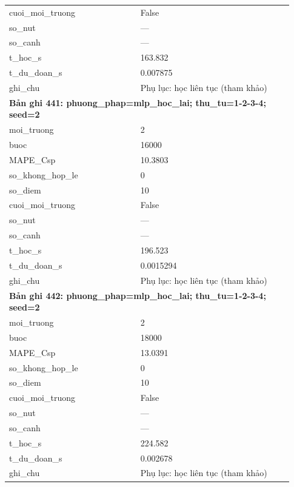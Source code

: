 \begin{longtable}{p{0.43\linewidth}p{0.50\linewidth}}
cuoi\_\allowbreak moi\_\allowbreak truong & False \\
so\_\allowbreak nut & — \\
so\_\allowbreak canh & — \\
t\_\allowbreak hoc\_\allowbreak s & 163.832 \\
t\_\allowbreak du\_\allowbreak doan\_\allowbreak s & 0.007875 \\
ghi\_\allowbreak chu & Phụ lục: học liên tục (tham khảo) \\
\midrule
\multicolumn{2}{p{0.95\linewidth}}{\textbf{Bản ghi 441: phuong\_phap=mlp\_hoc\_lai; thu\_tu=1-2-3-4; seed=2}} \\
moi\_\allowbreak truong & 2 \\
buoc & 16000 \\
MAPE\_\allowbreak Csp & 10.3803 \\
so\_\allowbreak khong\_\allowbreak hop\_\allowbreak le & 0 \\
so\_\allowbreak diem & 10 \\
cuoi\_\allowbreak moi\_\allowbreak truong & False \\
so\_\allowbreak nut & — \\
so\_\allowbreak canh & — \\
t\_\allowbreak hoc\_\allowbreak s & 196.523 \\
t\_\allowbreak du\_\allowbreak doan\_\allowbreak s & 0.0015294 \\
ghi\_\allowbreak chu & Phụ lục: học liên tục (tham khảo) \\
\midrule
\multicolumn{2}{p{0.95\linewidth}}{\textbf{Bản ghi 442: phuong\_phap=mlp\_hoc\_lai; thu\_tu=1-2-3-4; seed=2}} \\
moi\_\allowbreak truong & 2 \\
buoc & 18000 \\
MAPE\_\allowbreak Csp & 13.0391 \\
so\_\allowbreak khong\_\allowbreak hop\_\allowbreak le & 0 \\
so\_\allowbreak diem & 10 \\
cuoi\_\allowbreak moi\_\allowbreak truong & False \\
so\_\allowbreak nut & — \\
so\_\allowbreak canh & — \\
t\_\allowbreak hoc\_\allowbreak s & 224.582 \\
t\_\allowbreak du\_\allowbreak doan\_\allowbreak s & 0.002678 \\
ghi\_\allowbreak chu & Phụ lục: học liên tục (tham khảo) \\

\end{longtable}
